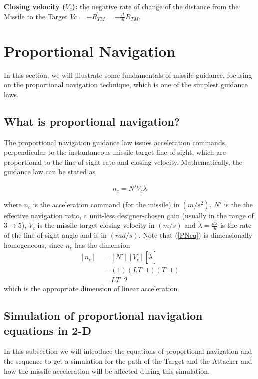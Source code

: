 \textbf{Closing velocity ($V_c$):} the negative rate of change of the distance
from the Missile to the Target $Vc= -\dot{R_{TM}}=-\frac{d}{dt} R_{TM} $.




\section{Proportional Navigation}
In this section, we will illustrate some fundamentals of missile guidance, focusing on the proportional navigation technique, which is one of the simplest guidance laws.

\subsection*{What is proportional navigation?}
The proportional navigation guidance law issues acceleration commands,
perpendicular to the instantaneous missile-target line-of-sight, which are
proportional to the line-of-sight rate and closing velocity. Mathematically, the
guidance law can be stated as

\begin{equation}
	n_c= N' V_c \dot{\lambda}
	\label{PNeq}
\end{equation}

where $n_c$ is the acceleration command (for the missile) in $(m/s^2)$, $N'$ is the the effective navigation ratio, a unit-less designer-chosen gain (usually in the range of $3 \to 5$), $V_c$ is the missile-target closing velocity in $(m/s)$ and $\dot{\lambda} = \frac{d\lambda}{dt}$ is the rate of the line-of-sight angle and is in $(rad/s)$. Note that (\ref{PNeq}) is dimensionally homogeneous, since $n_c$ has the dimension
\begin{equation}
	\begin{split}
	[n_c] &= [N'] [V_c] [\dot{\lambda}]\\
	&=(1) (LT^-1) (T^-1)\\
	&=LT^-2
	\end{split}
	\label{PN dimensionallity}
\end{equation}
which is the appropriate dimension of linear acceleration.

\subsection{Simulation of proportional navigation equations in 2-D}
In this subsection we will introduce the equations of proportional navigation and the sequence to get a simulation for the path of the Target and the Attacker and how the missile acceleration will be affected during this simulation.

